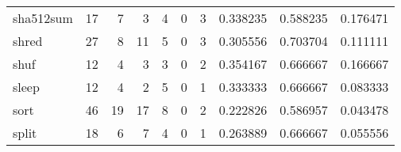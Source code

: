 \begin{longtable}{lrrrrrrrrr}
sha512sum &                                      17 &                                                  7 &                                                  3 &                                                  4 &                                                  0 &                                                  3 &                                           0.338235 &                               0.588235 &                             0.176471 \\
shred     &                                      27 &                                                  8 &                                                 11 &                                                  5 &                                                  0 &                                                  3 &                                           0.305556 &                               0.703704 &                             0.111111 \\
shuf      &                                      12 &                                                  4 &                                                  3 &                                                  3 &                                                  0 &                                                  2 &                                           0.354167 &                               0.666667 &                             0.166667 \\
sleep     &                                      12 &                                                  4 &                                                  2 &                                                  5 &                                                  0 &                                                  1 &                                           0.333333 &                               0.666667 &                             0.083333 \\
sort      &                                      46 &                                                 19 &                                                 17 &                                                  8 &                                                  0 &                                                  2 &                                           0.222826 &                               0.586957 &                             0.043478 \\
split     &                                      18 &                                                  6 &                                                  7 &                                                  4 &                                                  0 &                                                  1 &                                           0.263889 &                               0.666667 &                             0.055556 \\

\end{longtable}
